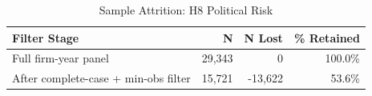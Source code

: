 \begin{table}[htbp]
\centering
\small
\caption{Sample Attrition: H8 Political Risk}
\label{tab:sample_attrition_h8_political_risk}
\begin{tabular}{lrrr}
\toprule
Filter Stage & N & N Lost & \% Retained \\
\midrule
Full firm-year panel & 29,343 & 0 & 100.0\% \\
After complete-case + min-obs filter & 15,721 & -13,622 & 53.6\% \\
\bottomrule
\end{tabular}
\end{table}